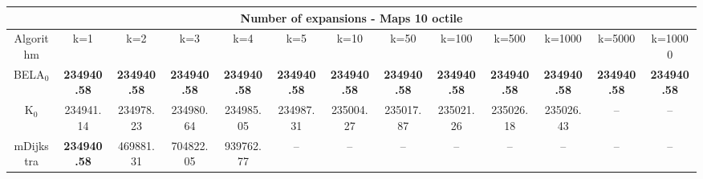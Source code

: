 \begin{tabular}{c|cccccccccccc}\toprule
\multicolumn{13}{c}{Number of expansions - Maps 10 octile}\\ \midrule
Algorithm & k=1 & k=2 & k=3 & k=4 & k=5 & k=10 & k=50 & k=100 & k=500 & k=1000 & k=5000 & k=10000 \\ \midrule
BELA$_0$ & \textbf{234940.58} & \textbf{234940.58} & \textbf{234940.58} & \textbf{234940.58} & \textbf{234940.58} & \textbf{234940.58} & \textbf{234940.58} & \textbf{234940.58} & \textbf{234940.58} & \textbf{234940.58} & \textbf{234940.58} & \textbf{234940.58} \\
K$_0$ & 234941.14 & 234978.23 & 234980.64 & 234985.05 & 234987.31 & 235004.27 & 235017.87 & 235021.26 & 235026.18 & 235026.43 & -- & -- \\
mDijkstra & \textbf{234940.58} & 469881.31 & 704822.05 & 939762.77 & -- & -- & -- & -- & -- & -- & -- & -- \\ \bottomrule 
\end{tabular}
